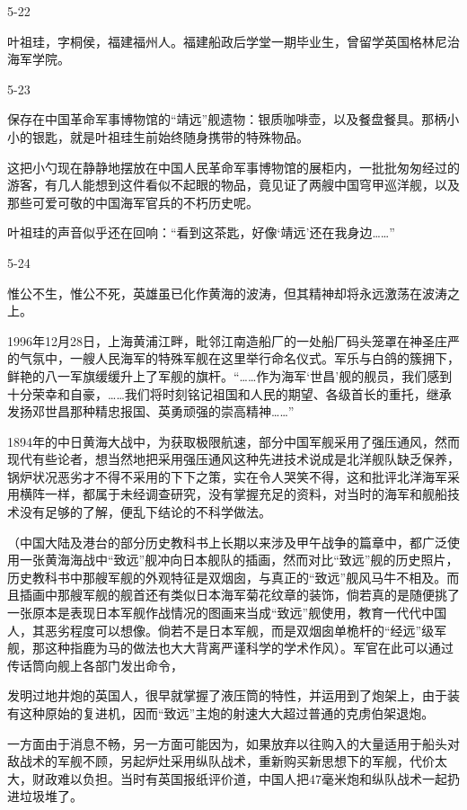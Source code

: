 \documentclass[12pt,UTF8]{ctexbook}
\begin{document}
5-22

叶祖珪，字桐侯，福建福州人。福建船政后学堂一期毕业生，曾留学英国格林尼治海军学院。

5-23

保存在中国革命军事博物馆的“靖远”舰遗物：银质咖啡壶，以及餐盘餐具。那柄小小的银匙，就是叶祖珪生前始终随身携带的特殊物品。

这把小勺现在静静地摆放在中国人民革命军事博物馆的展柜内，一批批匆匆经过的游客，有几人能想到这件看似不起眼的物品，竟见证了两艘中国穹甲巡洋舰，以及那些可爱可敬的中国海军官兵的不朽历史呢。

叶祖珪的声音似乎还在回响：“看到这茶匙，好像‘靖远’还在我身边……”

5-24

惟公不生，惟公不死，英雄虽已化作黄海的波涛，但其精神却将永远激荡在波涛之上。

1996年12月28日，上海黄浦江畔，毗邻江南造船厂的一处船厂码头笼罩在神圣庄严的气氛中，一艘人民海军的特殊军舰在这里举行命名仪式。军乐与白鸽的簇拥下，鲜艳的八一军旗缓缓升上了军舰的旗杆。“……作为海军‘世昌’舰的舰员，我们感到十分荣幸和自豪，……我们将时刻铭记祖国和人民的期望、各级首长的重托，继承发扬邓世昌那种精忠报国、英勇顽强的崇高精神……”

1894年的中日黄海大战中，为获取极限航速，部分中国军舰采用了强压通风，然而现代有些论者，想当然地把采用强压通风这种先进技术说成是北洋舰队缺乏保养，锅炉状况恶劣才不得不采用的下下之策，实在令人哭笑不得，这和批评北洋海军采用横阵一样，都属于未经调查研究，没有掌握充足的资料，对当时的海军和舰船技术没有足够的了解，便乱下结论的不科学做法。

（中国大陆及港台的部分历史教科书上长期以来涉及甲午战争的篇章中，都广泛使用一张黄海海战中“致远”舰冲向日本舰队的插画，然而对比“致远”舰的历史照片，历史教科书中那艘军舰的外观特征是双烟囱，与真正的“致远”舰风马牛不相及。而且插画中那艘军舰的舰首还有类似日本海军菊花纹章的装饰，倘若真的是随便挑了一张原本是表现日本军舰作战情况的图画来当成“致远”舰使用，教育一代代中国人，其恶劣程度可以想像。倘若不是日本军舰，而是双烟囱单桅杆的“经远”级军舰，那这种指鹿为马的做法也大大背离严谨科学的学术作风）。军官在此可以通过传话筒向舰上各部门发出命令，

发明过地井炮的英国人，很早就掌握了液压筒的特性，并运用到了炮架上，由于装有这种原始的复进机，因而“致远”主炮的射速大大超过普通的克虏伯架退炮。

一方面由于消息不畅，另一方面可能因为，如果放弃以往购入的大量适用于船头对敌战术的军舰不顾，另起炉灶采用纵队战术，重新购买新思想下的军舰，代价太大，财政难以负担。当时有英国报纸评价道，中国人把47毫米炮和纵队战术一起扔进垃圾堆了。
\end{document}
